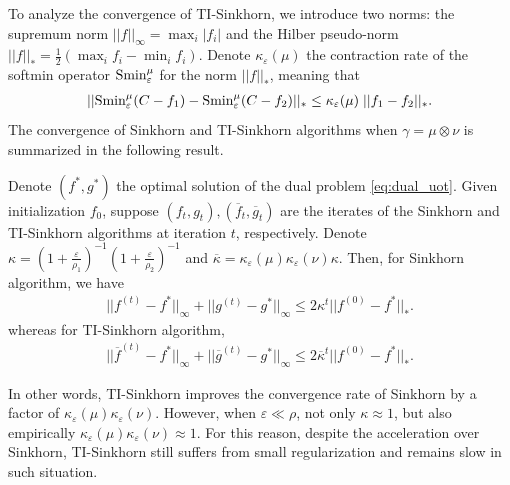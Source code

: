To analyze the convergence of TI-Sinkhorn, we introduce two norms:
the supremum norm $||f||_{\infty} = \max_i | f_i|$ and the
Hilber pseudo-norm $||f||_* = \frac{1}{2} \left( \max_i f_i - \min_i f_i \right)$.
Denote $\kappa_{\varepsilon}(\mu)$ the contraction rate of the softmin operator
$\text{Smin}_{\varepsilon}^{\mu}$ for the norm $||f||_*$, meaning that
\begin{align}
  ||\text{Smin}_{\varepsilon}^{\mu}(C - f_1) - \text{Smin}_{\varepsilon}^{\mu}(C - f_2) ||_* \leq
  \kappa_{\varepsilon}(\mu) \; || f_1 - f_2 ||_*.
\end{align}
The convergence of Sinkhorn and TI-Sinkhorn algorithms when $\gamma = \mu \otimes \nu$
is summarized in the following result.
\begin{proposition}
   Denote $(f^*, g^*)$ the optimal solution of
  the dual problem \eqref{eq:dual_uot}. Given initialization $f_0$, suppose
  $(f_t, g_t), (\overline{f}_t, \overline{g}_t)$ are the iterates
  of the Sinkhorn and TI-Sinkhorn algorithms at iteration $t$, respectively. Denote
  $\kappa = \left( 1 + \frac{\varepsilon}{\rho_1} \right)^{-1}
  \left( 1 + \frac{\varepsilon}{\rho_2} \right)^{-1}$
  and $\overline{\kappa} = \kappa_{\varepsilon}(\mu) \kappa_{\varepsilon}(\nu) \kappa$. Then,
  for Sinkhorn algorithm, we have
  \begin{align}
    || f^{(t)} - f^* ||_{\infty} + || g^{(t)} - g^* ||_{\infty} \leq
    2 \kappa^t || f^{(0)} - f^* ||_*.
  \end{align}
  whereas for TI-Sinkhorn algorithm,
  \begin{align}
    || \overline{f}^{(t)} - f^* ||_{\infty} + || \overline{g}^{(t)} - g^* ||_{\infty} \leq
    2 \overline{\kappa}^t || f^{(0)} - f^* ||_*.
  \end{align}
\end{proposition}
In other words, TI-Sinkhorn improves the convergence rate of Sinkhorn by a factor of
$\kappa_{\varepsilon}(\mu) \kappa_{\varepsilon}(\nu)$. However, when $\varepsilon \ll \rho$,
not only $\kappa \approx 1$, but also empirically
$\kappa_{\varepsilon}(\mu) \kappa_{\varepsilon}(\nu) \approx 1$.
For this reason, despite the acceleration over Sinkhorn,
TI-Sinkhorn still suffers from small regularization and remains slow in such situation.

